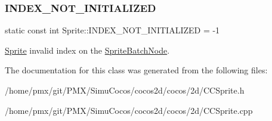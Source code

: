 \subsubsection{\texorpdfstring{I\+N\+D\+E\+X\+\_\+\+N\+O\+T\+\_\+\+I\+N\+I\+T\+I\+A\+L\+I\+Z\+ED}{INDEX\_NOT\_INITIALIZED}}
{\footnotesize\ttfamily static const int Sprite\+::\+I\+N\+D\+E\+X\+\_\+\+N\+O\+T\+\_\+\+I\+N\+I\+T\+I\+A\+L\+I\+Z\+ED = -\/1\hspace{0.3cm}{\ttfamily [static]}}

\hyperlink{classSprite}{Sprite} invalid index on the \hyperlink{classSpriteBatchNode}{Sprite\+Batch\+Node}. 

The documentation for this class was generated from the following files\+:\begin{DoxyCompactItemize}
\item 
/home/pmx/git/\+P\+M\+X/\+Simu\+Cocos/cocos2d/cocos/2d/C\+C\+Sprite.\+h\item 
/home/pmx/git/\+P\+M\+X/\+Simu\+Cocos/cocos2d/cocos/2d/C\+C\+Sprite.\+cpp\end{DoxyCompactItemize}
